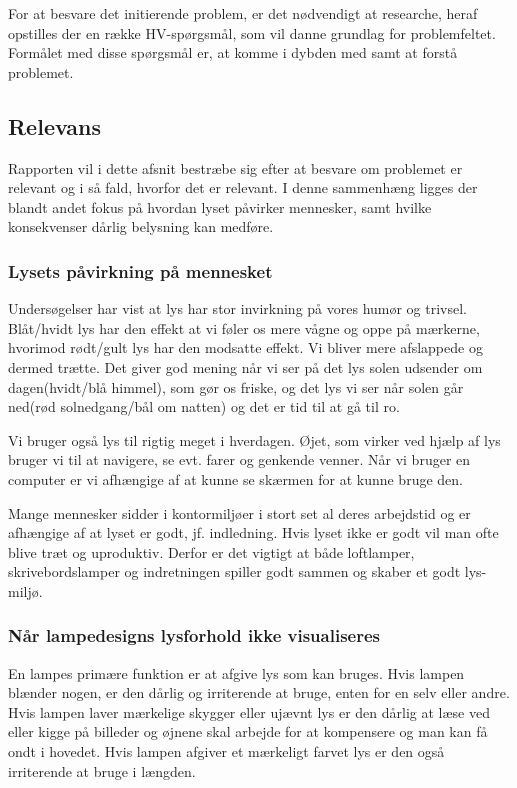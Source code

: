 For at besvare det initierende problem, er det nødvendigt at researche, heraf opstilles der en række HV-spørgsmål, som vil danne grundlag for problemfeltet. Formålet med disse spørgsmål er, at komme i dybden med samt at forstå problemet.

\subsection{Relevans}
Rapporten vil i dette afsnit bestræbe sig efter at besvare om problemet er relevant og i så fald, hvorfor det er relevant. I denne sammenhæng ligges der blandt andet fokus på hvordan lyset påvirker mennesker, samt hvilke konsekvenser dårlig belysning kan medføre. 

\subsubsection{Lysets påvirkning på mennesket}

Undersøgelser har vist at lys har stor invirkning på vores humør og trivsel.
Blåt/hvidt lys har den effekt at vi føler os mere vågne og oppe på mærkerne\cite{videnskab_dk_paavirkning}, hvorimod rødt/gult lys har den modsatte effekt. Vi bliver mere afslappede og dermed trætte. Det giver god mening når vi ser på det lys solen udsender om dagen(hvidt/blå himmel), som gør os friske, og det lys vi ser når solen går ned(rød solnedgang/bål om natten) og det er tid til at gå til ro. 

Vi bruger også lys til rigtig meget i hverdagen. Øjet, som virker ved hjælp af lys bruger vi til at navigere, se evt. farer og genkende venner. Når vi bruger en computer er vi afhængige af at kunne se skærmen for at kunne bruge den. 

Mange mennesker sidder i kontormiljøer i stort set al deres arbejdstid og er afhængige af at lyset er godt, jf. indledning. Hvis lyset ikke er godt vil man ofte blive træt og uproduktiv. Derfor er det vigtigt at både loftlamper, skrivebordslamper og indretningen spiller godt sammen og skaber et godt lys-miljø.


\subsubsection{Når lampedesigns lysforhold ikke visualiseres}

En lampes primære funktion er at afgive lys som kan bruges. Hvis lampen blænder nogen, er den dårlig og irriterende at bruge, enten for en selv eller andre. Hvis lampen laver mærkelige skygger eller ujævnt lys er den dårlig at læse ved eller kigge på billeder og øjnene skal arbejde for at kompensere og man kan få ondt i hovedet\cite{lys_konsekvenser}. Hvis lampen afgiver et mærkeligt farvet lys er den også irriterende at bruge i længden.

